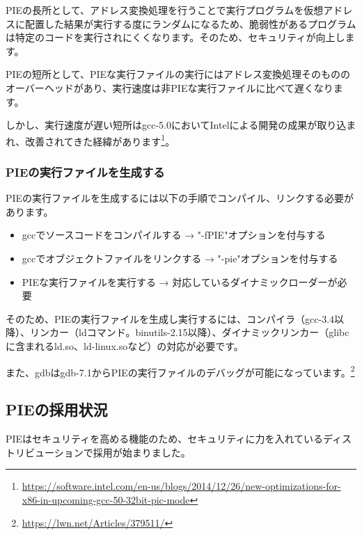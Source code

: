 \documentclass[mingoth,a4paper]{jsarticle}
\begin{document}
PIEの長所として、アドレス変換処理を行うことで実行プログラムを仮想アドレスに配置した結果が実行する度にランダムになるため、脆弱性があるプログラムは特定のコードを実行されにくくなります。そのため、セキュリティが向上します。


PIEの短所として、PIEな実行ファイルの実行にはアドレス変換処理そのもののオーバーヘッドがあり、実行速度は非PIEな実行ファイルに比べて遅くなります。


しかし、実行速度が遅い短所はgcc-5.0においてIntelによる開発の成果が取り込まれ、改善されてきた経緯があります\footnote{\url{https://software.intel.com/en-us/blogs/2014/12/26/new-optimizations-for-x86-in-upcoming-gcc-50-32bit-pic-mode}}。


\subsubsection{PIEの実行ファイルを生成する}

PIEの実行ファイルを生成するには以下の手順でコンパイル、リンクする必要があります。

\begin{itemize}
\item gccでソースコードをコンパイルする → "-fPIE"オプションを付与する
\item gccでオブジェクトファイルをリンクする → "-pie"オプションを付与する
\item PIEな実行ファイルを実行する → 対応しているダイナミックローダーが必要
\end{itemize}


そのため、PIEの実行ファイルを生成し実行するには、コンパイラ（gcc-3.4以降）、リンカー（ldコマンド。binutils-2.15以降）、ダイナミックリンカー（glibcに含まれるld.so、ld-linux.soなど）の対応が必要です。


また、gdbはgdb-7.1からPIEの実行ファイルのデバッグが可能になっています。\footnote{\url{https://lwn.net/Articles/379511/}}


\subsection{PIEの採用状況}

PIEはセキュリティを高める機能のため、セキュリティに力を入れているディストリビューションで採用が始まりました。
\end{document}
